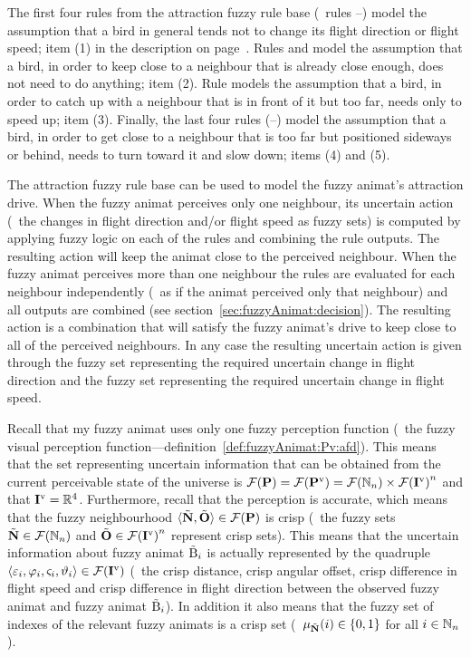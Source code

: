 The first four rules from the attraction fuzzy rule base (\ie\ rules --) model the assumption that a bird in general tends not to change its flight direction or flight speed; item (1) in the description on page~\pageref{dscr:attraction}. Rules  and  model the assumption that a bird, in order to keep close to a neighbour that is already close enough, does not need to do anything; item (2). Rule  models the assumption that a bird, in order to catch up with a neighbour that is in front of it but too far, needs only to speed up; item (3). Finally, the last four rules (--) model the assumption that a bird, in order to get close to a neighbour that is too far but positioned sideways or behind, needs to turn toward it and slow down; items (4) and (5). 

The attraction fuzzy rule base can be used to model the fuzzy animat's attraction drive. When the fuzzy animat perceives only one neighbour, its uncertain action (\ie\ the changes in flight direction and/or flight speed as fuzzy sets) is computed by applying fuzzy logic on each of the rules and combining the rule outputs. The resulting action will keep the animat close to the perceived neighbour. When the fuzzy animat perceives more than one neighbour the rules are evaluated for each neighbour independently (\ie\ as if the animat perceived only that neighbour) and all outputs are combined (see section~\ref{sec:fuzzyAnimat:decision}). The resulting action is a combination that will satisfy the fuzzy animat's drive to keep close to all of the perceived neighbours. In any case the resulting uncertain action is given through the fuzzy set representing the required uncertain change in flight direction and the fuzzy set representing the required uncertain change in flight speed.

Recall that my fuzzy animat uses only one fuzzy perception function (\ie\ the fuzzy visual perception function---definition~\ref{def:fuzzyAnimat:Pv:afd}). This means that the set representing uncertain information that can be obtained from the current perceivable state of the universe is ${\mathcal{F}({\mathbf{P}})}={\mathcal{F}({\mathbf{P}}^\mathrm{v})}={\mathcal{F}(\mathbb{N}_n)} \times {\ensuremath{\mathcal{F}({\mathbf{I}}^\mathrm{v})}}^n$ and that ${\mathbf{I}}^\mathrm{v}=\mathbb{R}^4$. Furthermore, recall that the perception is accurate, which means that the fuzzy neighbourhood $\langle {\ensuremath{\tilde{{\mathbf{N}}}}}, {\tilde{{\mathbf{O}}}} \rangle \in {\ensuremath{\mathcal{F}({\mathbf{P}})}}$ is crisp (\ie\ the fuzzy sets ${\tilde{{\mathbf{N}}}} \in {\ensuremath{\mathcal{F}(\mathbb{N}_n)}}$ and ${\tilde{{\mathbf{O}}}} \in {\ensuremath{\mathcal{F}({\mathbf{I}}^\mathrm{v})}}^n$ represent crisp sets). This means that the uncertain information about fuzzy animat ${\tilde{\mathrm{B}}}_i$ is actually represented by the quadruple $\langle \varepsilon_i, \varphi_i, \varsigma_i, \vartheta_i \rangle \in {\ensuremath{\mathcal{F}({\mathbf{I}}^\mathrm{v})}}$ (\ie\ the crisp distance, crisp angular offset, crisp difference in flight speed and crisp difference in flight direction between the observed fuzzy animat and fuzzy animat ${\tilde{\mathrm{B}}}_i$). In addition it also means that the fuzzy set of indexes of the relevant fuzzy animats is a crisp set (\ie\ $\mu_{\tilde{{\mathbf{N}}}}(i) \in \left\{0,1\right\}$ for all $i \in \mathbb{N}_n$). 

